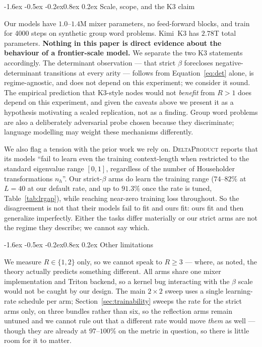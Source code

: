 \documentclass[10pt,twocolumn]{article}
\makeatletter
\renewcommand\subsection{\@startsection{subsection}{2}{\z@}%
  {-1.6ex \@plus -0.5ex \@minus -0.2ex}{0.8ex \@plus 0.2ex}%
  {\normalfont\normalsize\bfseries}}
\makeatother
\begin{document}
\subsection{Scale, scope, and the K3 claim}
\label{sec:scale}

Our models have $1.0$--$1.4$M mixer parameters, no feed-forward blocks, and
train for 4000 steps on synthetic group word problems. Kimi~K3 has $2.78$T total
parameters. \textbf{Nothing in this paper is direct evidence about the behaviour
of a frontier-scale model.} We separate the two K3 statements accordingly. The
determinant observation --- that strict $\beta$ forecloses negative-determinant
transitions at every arity --- follows from Equation~\eqref{eq:det} alone, is
regime-agnostic, and does not depend on this experiment; we consider it sound.
The empirical prediction that K3-style nodes would not \emph{benefit} from
$R>1$ does depend on this experiment, and given the caveats above we
present it as a hypothesis motivating a scaled replication, not as a finding.
Group word problems are also a deliberately adversarial probe chosen because
they discriminate; language modelling may weight these mechanisms differently.

We also flag a tension with the prior work we rely on.
\textsc{DeltaProduct} reports that its models ``fail to learn even the training
context-length when restricted to the standard eigenvalue range $[0,1]$,
regardless of the number of Householder transformations $n_h$''. Our strict-$\beta$
arms do learn the training range ($74$--$82\%$ at $L=40$ at our default rate,
and up to $91.3\%$ once the rate is tuned, Table~\ref{tab:lrgap}), while
reaching near-zero training loss throughout. So the disagreement is not that
their models fail to fit and ours fit: ours fit and then generalize
imperfectly. Either the tasks differ materially or our strict arms are not the
regime they describe; we cannot say which.

\subsection{Other limitations}

We measure $R\in\{1,2\}$ only, so we cannot speak to $R\ge3$ --- where, as noted,
the theory actually predicts something different. All arms share one mixer
implementation and Triton backend, so a kernel bug interacting with the $\beta$
scale would not be caught by our design. The main $2\times2$ sweep uses a single
learning-rate schedule per arm; Section~\ref{sec:trainability} sweeps the rate
for the strict arms only, on three bundles rather than six, so the reflection
arms remain untuned and we cannot rule out that a different rate would move
\emph{them} as well --- though they are already at $97$--$100\%$ on the metric in
question, so there is little room for it to matter.
\end{document}
